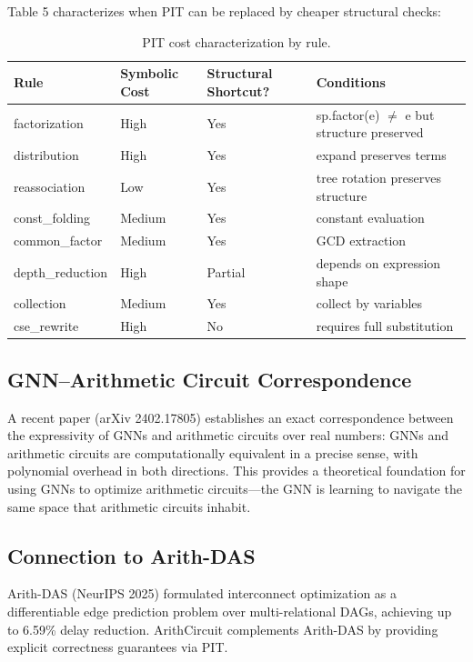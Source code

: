 \documentclass[10pt]{article}
\begin{document}
Table 5 characterizes when PIT can be replaced by cheaper structural checks:

\begin{table}[h]
\centering
\caption{PIT cost characterization by rule.}
\label{tab:pit}
\begin{tabular}{llll}
\toprule
Rule & Symbolic Cost & Structural Shortcut? & Conditions \\
\midrule
factorization & High & Yes & sp.factor(e) $\neq$ e but structure preserved \\
distribution & High & Yes & expand preserves terms \\
reassociation & Low & Yes & tree rotation preserves structure \\
const\_folding & Medium & Yes & constant evaluation \\
common\_factor & Medium & Yes & GCD extraction \\
depth\_reduction & High & Partial & depends on expression shape \\
collection & Medium & Yes & collect by variables \\
cse\_rewrite & High & No & requires full substitution \\
\bottomrule
\end{tabular}
\end{table}

\subsection{GNN–Arithmetic Circuit Correspondence}

A recent paper (arXiv 2402.17805) establishes an exact correspondence between
the expressivity of GNNs and arithmetic circuits over real numbers: GNNs and
arithmetic circuits are computationally equivalent in a precise sense, with
polynomial overhead in both directions. This provides a theoretical foundation
for using GNNs to optimize arithmetic circuits—the GNN is learning to navigate
the same space that arithmetic circuits inhabit.

\subsection{Connection to Arith-DAS}

Arith-DAS (NeurIPS 2025) formulated interconnect optimization as a
differentiable edge prediction problem over multi-relational DAGs, achieving
up to 6.59\% delay reduction. ArithCircuit complements Arith-DAS by providing
explicit correctness guarantees via PIT.
\end{document}
